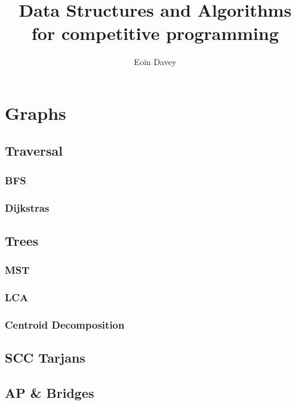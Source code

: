 \documentclass[twocolumn]{article}
\begin{document}
    \title{Data Structures and Algorithms for competitive programming}
    \author{Eoin Davey}
    \maketitle
    \tableofcontents
    \newpage

    \section{Graphs}

    \subsection{Traversal}
        \subsubsection{BFS}
        
        \subsubsection{Dijkstras}
        

    \subsection{Trees}
        \subsubsection{MST}
        
        \subsubsection{LCA}
        
        \subsubsection{Centroid Decomposition}
        

    \subsection{SCC Tarjans}
    

    \subsection{AP \& Bridges}
    
\end{document}
